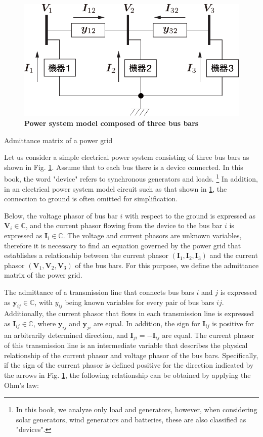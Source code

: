 \documentclass[graybox, envcountchap]{svmult}
\begin{document}
\begin{figure}[t]
  \centering
  \includegraphics[width = .60\linewidth]{figs/3busex}
  \medskip
  \caption{\textbf{Power system model composed of three bus bars}}
  \label{fig:3busex}
  \medskip
\end{figure}

\begin{example}{Admittance matrix of a power grid}\label{ex:derY}

Let us consider a simple electrical power system consisting of three bus bars as
shown in Fig. \ref{fig:3busex}. Assume that to each bus there is a device
connected. In this book, the word "device" refers to synchronous generators and
loads. \footnote{In this book, we analyze only load and generators, however,
when considering solar generators, wind generators and batteries, these are also
classified as "devices".} In addition, in an electrical power system model
circuit such as that shown in \ref{fig:3busex}, the connection to ground is
often omitted for simplification.

Below, the voltage phasor of bus bar $i$ with respect to the ground is expressed
as $\bm{V}_i \in \mathbb{C}$, and the current phasor flowing from the device to
the bus bar $i$ is expressed as $\bm{I}_i \in \mathbb{C}$. The voltage and
current phasors are unknown variables, therefore it is necessary to find an
equation governed by the power grid that establishes a relationship between the
current phasor $(\bm{I}_1,\bm{I}_2,\bm{I}_3)$ and the current phasor
$(\bm{V}_1,\bm{V}_2,\bm{V}_3)$ of the bus bars. For this purpose, we define the
admittance matrix of the power grid. 

The admittance of a transmission line that connects bus bars $i$ and $j$ is
expressed as $\bm{y}_{ij}\in \mathbb{C}$, with $y_{ij}$ being known variables
for every pair of bus bars $ij$. Additionally, the current phasor that flows in
each transmission line is expressed as $\bm{I}_{ij}\in \mathbb{C}$, where
$\bm{y}_{ij}$ and $\bm{y}_{ji}$ are equal. In addition, the sign for
$\bm{I}_{ij}$ is positive for an arbitrarily determined direction, and
$\bm{I}_{ji} = -\bm{I}_{ij}$ are equal. The current phasor of this transmission
line is an intermediate variable that describes the physical relationship of the
current phasor and voltage phasor of the bus bars. Specifically, if the sign of
the current phasor is defined positive for the direction indicated by the arrows
in Fig. \ref{fig:3busex}, the following relationship can be obtained by applying
the Ohm's law:


\end{example}
\end{document}
